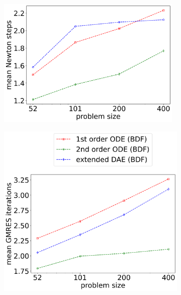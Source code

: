 \begin{figure}[H]
	\centering
	\begin{subfigure}[b]{0.32\textwidth}
		\centering
		\includegraphics[width=0.97\textwidth]{images/TANDEM_averageNumberNewtonSteps.png}
	\end{subfigure} 
	\begin{subfigure}[b]{0.32\textwidth}
		\centering
		\includegraphics[width=1\textwidth]{images/TANDEM_averageNumberKSPIteration.png}

\end{subfigure}
\end{figure}
